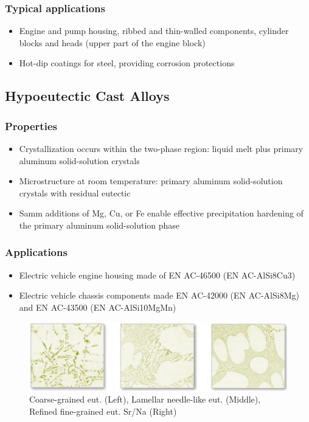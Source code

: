 \documentclass{article}
\begin{document}
\subsubsection{Typical applications}
\begin{itemize}
  \item Engine and pump housing, ribbed and thin-walled components, cylinder blocks and heads (upper part of the engine block)
  \item Hot-dip coatings for steel, providing corrosion protections 
\end{itemize}

\subsection{Hypoeutectic Cast Alloys}
\subsubsection{Properties}
\begin{itemize}
  \item Crystallization occurs within the two-phase region: liquid melt plus primary aluminum solid-solution crystals
  \item Microstructure at room temperature: primary aluminum solid-solution crystals with residual eutectic
  \item Samm additions of Mg, Cu, or Fe enable effective precipitation hardening of the primary aluminum solid-solution phase
\end{itemize}

\subsubsection{Applications}
\begin{itemize}
  \item Electric vehicle engine housing made of EN AC-46500 (EN AC-AlSi8Cu3)
  \item Electric vehicle chassis components made EN AC-42000 (EN AC-AlSi8Mg) and EN AC-43500 (EN AC-AlSi10MgMn)
\end{itemize}

\begin{figure}[ht!]
  \centering
  \includegraphics[width=.8\textwidth]{media/hypoeutectic-AC.png}
  \caption*{Coarse-grained eut. (Left), Lamellar needle-like eut. (Middle), Refined fine-grained eut. Sr/Na (Right)}
\end{figure}
\end{document}
